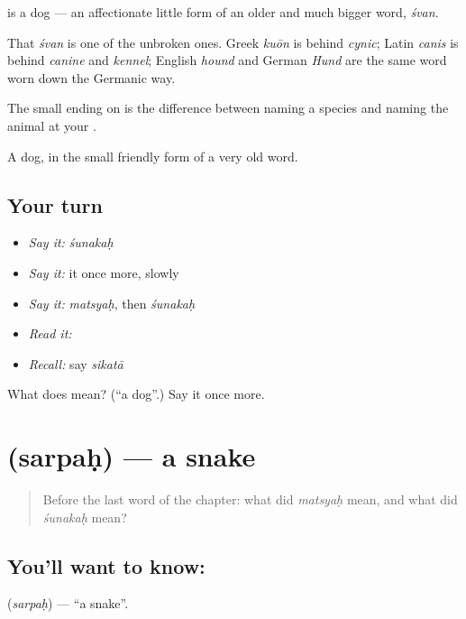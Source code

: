 \textbf{} is a dog — an affectionate little form of an older and much bigger word, \emph{śvan}.

That \emph{śvan} is one of the unbroken ones. Greek \emph{kuōn} is behind \emph{cynic}; Latin \emph{canis} is behind \emph{canine} and \emph{kennel}; English \emph{hound} and German \emph{Hund} are the same word worn down the Germanic way.

The small ending on \textbf{} is the difference between naming a species and naming the animal at your .

\begin{grammarlens}[title={What you've built}]
A dog, in the small friendly form of a very old word.
\end{grammarlens}

\subsection*{Your turn}
\begin{itemize}
\raggedright
  \item \emph{Say it:} \emph{śunakaḥ}
  \item \emph{Say it:} it once more, slowly
  \item \emph{Say it:} \emph{matsyaḥ}, then \emph{śunakaḥ}
  \item \emph{Read it:} \textbf{}
  \item \emph{Recall:} say \emph{sikatā}
\end{itemize}

\begin{tcolorbox}[breakable,colback=teal!4,colframe=teal!35!black,title={Before you move on}]
What does  mean? (\textquotedblleft{}a dog\textquotedblright{}.) Say it once more.
\end{tcolorbox}
\section[\texorpdfstring{\sk{सर्पः} (sarpaḥ)}{सर्पः (sarpaḥ)}]{ (sarpaḥ) — a snake}

\label{lesson:SA-C39-snake}



\begin{quote}
Before the last word of the chapter: what did \emph{matsyaḥ} mean, and what did \emph{śunakaḥ} mean?
\end{quote}

\subsection*{You'll want to know: }
\textbf{} (\emph{sarpaḥ}) — \textquotedblleft{}a snake\textquotedblright{}.

